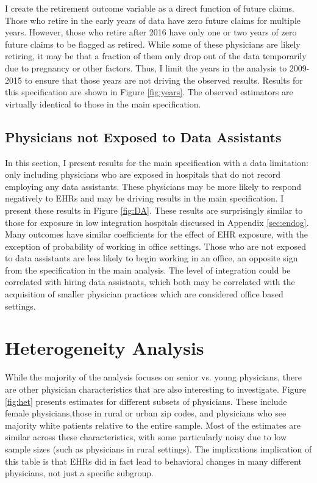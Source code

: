 \documentclass[11pt]{article}
\begin{document}
I create the retirement outcome variable as a direct function of future claims. Those who retire in the early years of data have zero future claims for multiple years. However, those who retire after 2016 have only one or two years of zero future claims to be flagged as retired. While some of these physicians are likely retiring, it may be that a fraction of them only drop out of the data temporarily due to pregnancy or other factors. Thus, I limit the years in the analysis to 2009-2015 to ensure that those years are not driving the observed results. Results for this specification are shown in Figure \ref{fig:years}. The observed estimators are virtually identical to those in the main specification. 

\subsection{Physicians not Exposed to Data Assistants}\label{app:DA}

In this section, I present results for the main specification with a data limitation: only including physicians who are exposed in hospitals that do not record employing any data assistants. These physicians may be more likely to respond negatively to EHRs and may be driving results in the main specification. I present these results in Figure \ref{fig:DA}. These results are surprisingly similar to those for exposure in low integration hospitals discussed in Appendix \ref{sec:endog}. Many outcomes have similar coefficients for the effect of EHR exposure, with the exception of probability of working in office settings. Those who are not exposed to data assistants are less likely to begin working in an office, an opposite sign from the specification in the main analysis. The level of integration could be correlated with hiring data assistants, which both may be correlated with the acquisition of smaller physician practices which are considered office based settings. 



\section{Heterogeneity Analysis}

While the majority of the analysis focuses on senior vs. young physicians, there are other physician characteristics that are also interesting to investigate. Figure \ref{fig:het} presents estimates for different subsets of physicians. These include female physicians,those in rural or urban zip codes, and physicians who see majority white patients relative to the entire sample. Most of the estimates are similar across these characteristics, with some particularly noisy due to low sample sizes (such as physicians in rural settings). The implications implication of this table is that EHRs did in fact lead to behavioral changes in many different physicians, not just a specific subgroup.  
\end{document}
